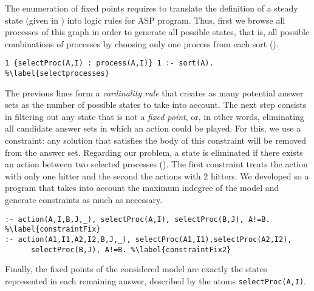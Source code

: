 The enumeration of fixed points requires to translate the definition of a steady state (given in )
into logic rules for ASP program. Thus, first we browse all processes of this graph in order to generate all possible states,
that is, all possible combinations of processes by choosing only one process from each sort ().
\begin{lstlisting}
1 {selectProc(A,I) : process(A,I)} 1 :- sort(A). %\label{selectprocesses}
\end{lstlisting}
The previous lines form a \emph{cardinality rule} that creates as many potential answer sets as the number of possible states
to take into account.
The next step consists in filtering out any state that is not a \emph{fixed point},
or, in other words, eliminating all candidate answer sets in which an action could be played. For this, we use a constraint:
any solution that satisfies the body of this constraint will be removed from the answer set.
Regarding our problem, a state is eliminated if there exists an action between two selected processes (). The first constraint  treats the action with only one hitter and the second  the actions with $2$ hitters. We developed so a program that takes into account the maximum indegree of the model and generate constraints as much as necessary.
\begin{lstlisting}
:- action(A,I,B,J,_), selectProc(A,I), selectProc(B,J), A!=B. %\label{constraintFix}
:- action(A1,I1,A2,I2,B,J,_), selectProc(A1,I1),selectProc(A2,I2), 
      selectProc(B,J), A!=B. %\label{constraintFix2}
\end{lstlisting}
Finally, the fixed points of the considered model are exactly the states represented in each remaining answer,
described by the atoms \texttt{selectProc(A,I)}.

